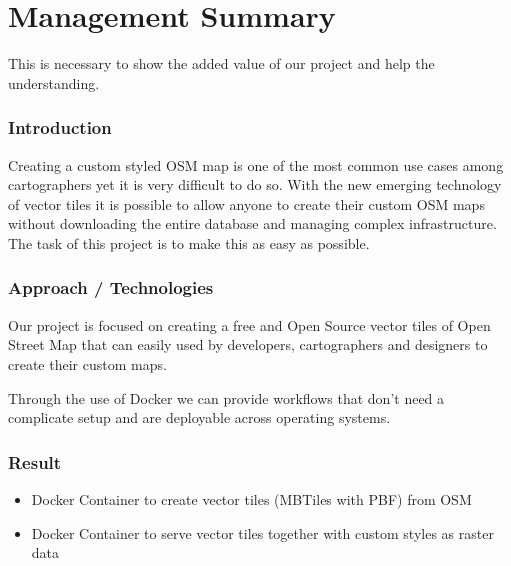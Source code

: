 
\begingroup
\let\clearpage\relax
\let\cleardoublepage\relax
\let\cleardoublepage\relax

\chapter*{Management Summary}
\label{management-summary}

This is necessary to show the added value of our project and help the understanding.



\subsection*{Introduction}\label{introduction}

Creating a custom styled OSM map is one of the most common use cases
among cartographers yet it is very difficult to do so. With the new
emerging technology of vector tiles it is possible to allow anyone to
create their custom OSM maps without downloading the entire database and
managing complex infrastructure. The task of this project is to make
this as easy as possible.

\subsection*{Approach / Technologies}

Our project is focused on creating a free and Open Source vector tiles
of Open Street Map that can easily used by developers, cartographers and
designers to create their custom maps.

Through the use of Docker we can provide workflows that don't need a
complicate setup and are deployable across operating systems.

\subsection*{Result}

\begin{itemize}
\item
  Docker Container to create vector tiles (MBTiles with PBF) from OSM
\item
  Docker Container to serve vector tiles together with custom styles as
  raster data
\end{itemize}

\endgroup			
\vfill
